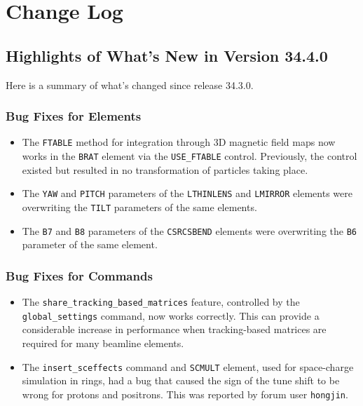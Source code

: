 \documentclass[11pt]{article}
\begin{document}
\newpage

\section{Change Log\label{sect:changeLog}}

\subsection{Highlights of What's New in Version 34.4.0}

Here is a summary of what's changed since release 34.3.0.

\subsubsection{Bug Fixes for Elements}

\begin{itemize}
\item The \verb|FTABLE| method for integration through 3D magnetic field maps now works in the \verb|BRAT|
  element via the \verb|USE_FTABLE| control. Previously, the control existed but resulted in no transformation
  of particles taking place.
\item The \verb|YAW| and \verb|PITCH| parameters of the \verb|LTHINLENS| and \verb|LMIRROR| elements were overwriting
  the \verb|TILT| parameters of the same elements. 
\item The \verb|B7| and \verb|B8| parameters of the \verb|CSRCSBEND| elements were overwriting the \verb|B6| parameter
  of the same element.
\end{itemize}

\subsubsection{Bug Fixes for Commands}
\begin{itemize}
\item The \verb|share_tracking_based_matrices| feature, controlled by the \verb|global_settings| command, now
  works correctly. This can provide a considerable increase in performance when tracking-based matrices are
  required for many beamline elements.
\item The \verb|insert_sceffects| command  and \verb|SCMULT| element, used for space-charge simulation in rings,
  had a bug that caused the sign of the tune shift to be wrong for protons and positrons. This was reported by
  forum user \verb|hongjin|.
\end{itemize}
\end{document}
